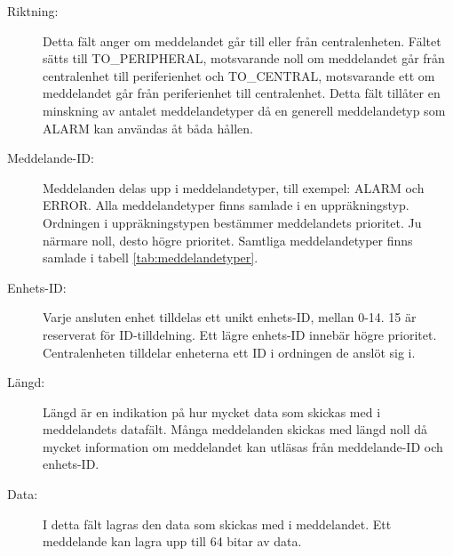 \documentclass[a4paper]{article}
\begin{document}
\begin{description}
    \item[Riktning:] Detta fält anger om meddelandet går till eller från centralenheten.
    Fältet sätts till TO\_PERIPHERAL, motsvarande noll om meddelandet går från centralenhet till periferienhet och TO\_CENTRAL, motsvarande ett om meddelandet går från periferienhet till centralenhet.
    Detta fält tillåter en minskning av antalet meddelandetyper då en generell meddelandetyp som ALARM kan användas åt båda hållen.

    \item[Meddelande-ID:] Meddelanden delas upp i meddelandetyper, till exempel: ALARM och ERROR. Alla meddelandetyper finns samlade i en uppräkningstyp. Ordningen i uppräkningstypen bestämmer meddelandets prioritet. Ju närmare noll, desto högre prioritet. Samtliga meddelandetyper finns samlade i tabell \ref{tab:meddelandetyper}.

    \item[Enhets-ID:] Varje ansluten enhet tilldelas ett unikt enhets-ID, mellan 0-14. 15 är reserverat för ID-tilldelning. Ett lägre enhets-ID innebär högre prioritet.
    Centralenheten tilldelar enheterna ett ID i ordningen de anslöt sig i.

    \item[Längd:] Längd är en indikation på hur mycket data som skickas med i meddelandets datafält.
    Många meddelanden skickas med längd noll då mycket information om meddelandet kan utläsas från meddelande-ID och enhets-ID.

    \item[Data:] I detta fält lagras den data som skickas med i meddelandet. Ett meddelande kan lagra upp till 64 bitar av data.
\end{description}

\begin{table}[H]
    \centering
    \caption{Diagram över CAN-meddelandets uppbyggnad samt ett exemepl på hur ett alarm-meddelande från en periferienhet ser ut.}
    \label{tab:meddelandestruktur}

\end{table}
\end{document}
